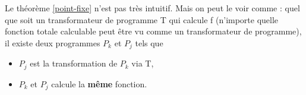 \begin{myrem}
	Le théorème \ref{point-fixe} n'est pas très intuitif. Mais on peut le
	voir comme : quel que soit un transformateur de programme T qui calcule f (n'importe quelle fonction totale calculable peut être vu comme un transformateur	de programme),
	il existe deux programmes $P_k$ et $P_j$ tels que
	\begin{itemize}
		\item $P_j$ est la transformation de $P_k$ via T,
		\item $P_k$ et $P_j$ calcule la \textbf{même} fonction.
	\end{itemize}
\end{myrem}

